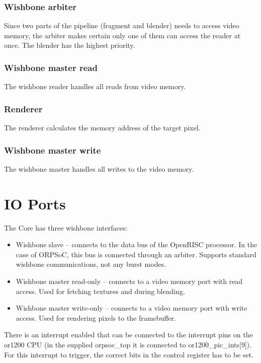 \documentclass[10pt,a4paper]{article}
\begin{document}
\subsubsection{Wishbone arbiter}
Since two parts of the pipeline (fragment and blender) needs to access video memory, the arbiter makes certain only one of them can access the reader at once. The blender has the highest priority.

\subsubsection{Wishbone master read}
The wishbone reader handles all reads from video memory.

\subsubsection{Renderer}
The renderer calculates the memory address of the target pixel.

\subsubsection{Wishbone master write}
The wishbone master handles all writes to the video memory.

\section{IO Ports}
The Core has three wishbone interfaces:

\begin{itemize}
\item Wishbone slave -- connects to the data bus of the OpenRISC processor. In the case of ORPSoC, this bus is connected through an arbiter. Supports standard wishbone communications, not any burst modes.
\item Wishbone master read-only -- connects to a video memory port with read access. Used for fetching textures and during blending.
\item Wishbone master write-only -- connects to a video memory port with write access. Used for rendering pixels to the framebuffer.
\end{itemize}

There is an interrupt enabled that can be connected to the interrupt pins on the or1200 CPU (in the supplied orpsoc\_top it is connected to or1200\_pic\_ints[9]). For this interrupt to trigger, the correct bits in the control register has to be set.
\end{document}
